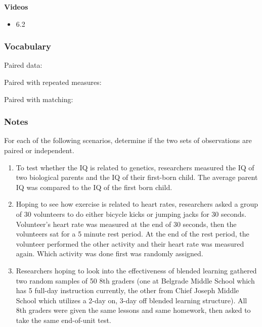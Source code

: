 \documentclass[
]{report}
\providecommand{\tightlist}{%
  \setlength{\itemsep}{0pt}\setlength{\parskip}{0pt}}
\newcommand{\rgs}{\vspace{12pt}} %
\newcommand{\rgi}{\hspace{24pt}}  %
\begin{document}

\textbf{Videos}

\begin{itemize}
\tightlist
\item
  6.2
\end{itemize}


\hypertarget{vocabulary-18}{%
\subsubsection*{Vocabulary}\label{vocabulary-18}}

Paired data:
\rgs

\rgi Paired with repeated measures:
\rgs

\rgi Paired with matching:
\rgs

\hypertarget{notes-23}{%
\subsubsection*{Notes}\label{notes-23}}

For each of the following scenarios, determine if the two sets of observations are paired or independent.

\begin{enumerate}
\def\labelenumi{\arabic{enumi}.}
\item
  To test whether the IQ is related to genetics, researchers measured the IQ of two biological parents and the IQ of their first-born child. The average parent IQ was compared to the IQ of the first born child.
  \rgs
\item
  Hoping to see how exercise is related to heart rates, researchers asked a group of 30 volunteers to do either bicycle kicks or jumping jacks for 30 seconds. Volunteer's heart rate was measured at the end of 30 seconds, then the volunteers sat for a 5 minute rest period. At the end of the rest period, the volunteer performed the other activity and their heart rate was measured again. Which activity was done first was randomly assigned.
  \rgs
\item
  Researchers hoping to look into the effectiveness of blended learning gathered two random samples of 50 8th graders (one at Belgrade Middle School which has 5 full-day instruction currently, the other from Chief Joseph Middle School which utilizes a 2-day on, 3-day off blended learning structure). All 8th graders were given the same lessons and same homework, then asked to take the same end-of-unit test.
  \rgs
\end{enumerate}
\end{document}
